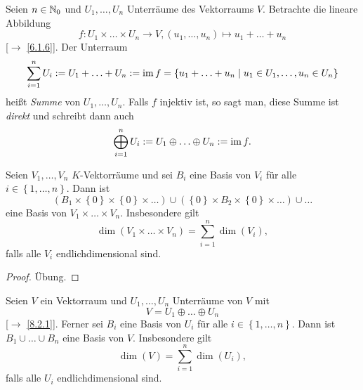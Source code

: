 \documentclass[../../main.tex]{subfiles}
\begin{document}
\begin{df}\label{8.2.1}
Seien $n\in \mathbb N_0$ und $U_1,\ldots,U_n$ Unterräume des Vektorraums $V$. Betrachte die lineare Abbildung \[f\colon U_1\times \ldots\times U_n\to V, (u_1,\ldots,u_n)\mapsto u_1+\ldots+u_n\] [$\to$ \ref{6.1.6}]. Der Unterraum
$$\sum_{i = 1}^{n}U_i := U_1 +\ldots+ U_n := \operatorname{im} f = \left\{u_1+\ldots+u_n\mid u_1\in U_1,\ldots,u_n\in U_n\right\}$$
heißt \emph{Summe} von $U_1,\ldots,U_n$. Falls $f$ injektiv ist, so sagt man, diese Summe ist \emph{direkt} und schreibt dann auch
\[\bigoplus_{i = 1}^{n}U_i := U_1\oplus \ldots\oplus U_n := \operatorname{im} f.\]
\end{df}

\begin{lem}\label{8.2.2}
Seien $V_1,\ldots,V_n$ $K$-Vektorräume und sei $B_i$ eine Basis von $V_i$ für alle $i\in \left\{1,\ldots,n\right\}$. Dann ist
\[(B_1\times\left\{0\right\}\times\left\{0\right\}\times \ldots)\cup (\left\{0\right\}\times B_2\times \left\{0\right\}\times \ldots)\cup\ldots\]
eine Basis von $V_1\times \ldots\times V_n$. Insbesondere gilt \[\dim (V_1\times \ldots\times V_n)=\sum_{i = 1}^{n}\dim (V_i),\] falls alle $V_i$ endlichdimensional sind.
\end{lem}
\begin{proof}
Übung.
\end{proof}

\begin{kor}\label{8.2.3}
Seien $V$ ein Vektorraum und $U_1,\ldots,U_n$ Unterräume von $V$ mit \[V = U_1\oplus\ldots\oplus U_n\]
{\rm[$\to$ \ref{8.2.1}]}. Ferner sei $B_i$ eine Basis von $U_i$ für alle $i\in \left\{1,\ldots,n\right\}$. Dann ist $B_1\cup \ldots\cup B_n$ eine Basis von $V$. Insbesondere gilt \[\dim (V) = \sum_{i = 1}^{n}\dim (U_i),\]
falls alle $U_i$ endlichdimensional sind.
\end{kor}
\end{document}
